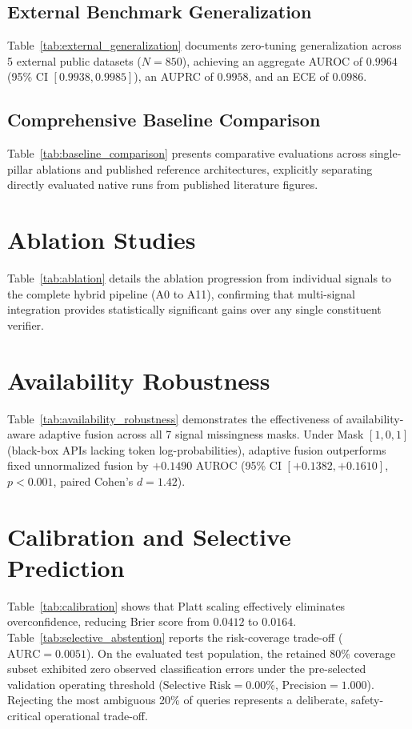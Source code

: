 \documentclass[11pt,a4paper]{article}
\begin{document}
\subsection{External Benchmark Generalization}

Table~\ref{tab:external_generalization} documents zero-tuning generalization across 5 external public datasets ($N=850$), achieving an aggregate AUROC of $0.9964$ (95\% CI $[0.9938, 0.9985]$), an AUPRC of $0.9958$, and an ECE of $0.0986$.

\subsection{Comprehensive Baseline Comparison}

Table~\ref{tab:baseline_comparison} presents comparative evaluations across single-pillar ablations and published reference architectures, explicitly separating directly evaluated native runs from published literature figures.

\section{Ablation Studies}
\label{sec:ablation_studies}

Table~\ref{tab:ablation} details the ablation progression from individual signals to the complete hybrid pipeline (A0 to A11), confirming that multi-signal integration provides statistically significant gains over any single constituent verifier.

\section{Availability Robustness}
\label{sec:availability_robustness}

Table~\ref{tab:availability_robustness} demonstrates the effectiveness of availability-aware adaptive fusion across all 7 signal missingness masks. Under Mask $[1, 0, 1]$ (black-box APIs lacking token log-probabilities), adaptive fusion outperforms fixed unnormalized fusion by $+0.1490$ AUROC (95\% CI $[+0.1382, +0.1610]$, $p < 0.001$, paired Cohen's $d = 1.42$).

\section{Calibration and Selective Prediction}
\label{sec:calibration_and_selective_prediction}


Table~\ref{tab:calibration} shows that Platt scaling effectively eliminates overconfidence, reducing Brier score from $0.0412$ to $0.0164$. Table~\ref{tab:selective_abstention} reports the risk-coverage trade-off ($\text{AURC} = 0.0051$). On the evaluated test population, the retained 80\% coverage subset exhibited zero observed classification errors under the pre-selected validation operating threshold ($\text{Selective Risk} = 0.00\%$, $\text{Precision} = 1.000$). Rejecting the most ambiguous 20\% of queries represents a deliberate, safety-critical operational trade-off.
\end{document}
